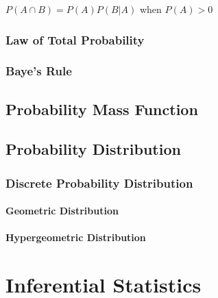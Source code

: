 $P(A \cap B) = P(A) P(B|A)$ when $P(A) > 0$



\subsubsection{Law of Total Probability}\label{sec:total_probability}

\subsubsection{Baye's Rule}\label{sec:bayes_rule}



\subsection{Probability Mass Function}\label{sec:probability_mass}

\subsection{Probability Distribution}
\label{sec:probability_distribution}

\subsubsection{Discrete Probability Distribution}
\label{sec:discrete_probability}

\paragraph{Geometric Distribution}\label{sec:geometric_distribution}

\paragraph{Hypergeometric Distribution}
\label{sec:hypergeometric_distribution}



\section{Inferential Statistics}\label{sec:inferential_statistics}

